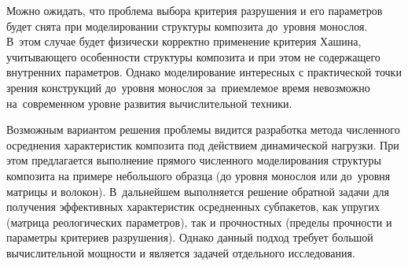 \documentclass[thesis.tex]{subfiles}
\begin{document}
Можно ожидать, что проблема выбора критерия разрушения и его параметров будет снята при моделировании структуры
композита до~уровня монослоя. В~этом случае будет физически корректно применение критерия Хашина, учитывающего
особенности структуры композита и при этом не содержащего внутренних параметров. Однако моделирование интересных с
практической точки зрения конструкций до~уровня монослоя за~приемлемое время невозможно на~современном уровне развития
вычислительной техники.

Возможным вариантом решения проблемы видится разработка метода численного осреднения характеристик композита под
действием динамической нагрузки. При этом предлагается выполнение прямого численного моделирования структуры композита
на примере небольшого образца (до уровня монослоя или до~уровня матрицы и волокон). В~дальнейшем выполняется решение
обратной задачи для получения эффективных характеристик осредненных субпакетов, как упругих (матрица реологических
параметров), так и прочностных (пределы прочности и параметры критериев разрушения). Однако данный подход требует
большой вычислительной мощности и является задачей отдельного исследования.
\end{document}
